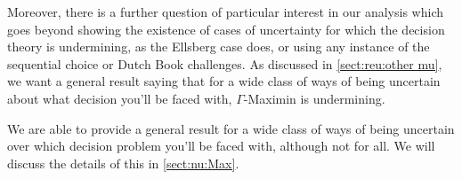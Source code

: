 \documentclass[a4paper]{article}
\renewcommand\P{\mathbb{P}} %
\newcommand\EU{\mathrm{EU}}
\newcommand{\IP}{\P}
\newcommand{\todoold}[2][]{\todo[backgroundcolor=white,bordercolor=orange!10,linecolor=gray!10, #1,caption={},textcolor=gray]{Pre-rev: #2}}
\newcommand{\todooldinfo}[2][]{\todoold[#1]{#2}}
\newenvironment{CCM rewritten}
{\begingroup\color{blue}} %
{\endgroup}              %
\begin{document}
{
\label{sect:gamma:other mu}

Moreover, there is a further question of particular interest in our analysis which goes beyond showing the existence of cases of uncertainty for which the decision theory is undermining, as the Ellsberg case does, or using any instance of the sequential choice or Dutch Book challenges. As discussed in \cref{sect:reu:other mu}, we want a general result saying that for a wide class of ways of being uncertain about what decision you'll be faced with, $\Gamma$-Maximin is undermining.

We are able to provide a general result for a wide class of ways of being uncertain over which decision problem you'll be faced with, although not for all. We will discuss the details of this in \cref{sect:nu:Max}. 


}

\end{document}
